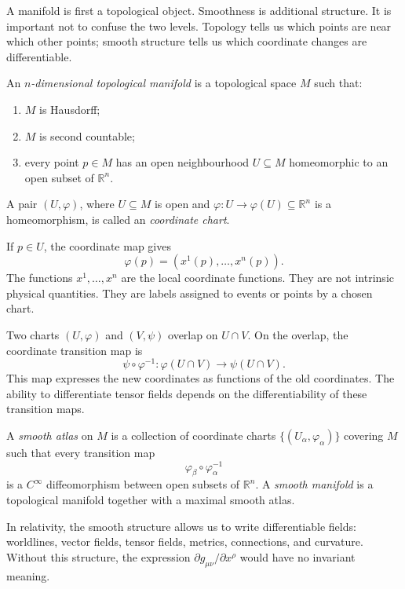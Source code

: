 A manifold is first a topological object. Smoothness is additional structure. It
is important not to confuse the two levels. Topology tells us which points are
near which other points; smooth structure tells us which coordinate changes are
differentiable.

\begin{definitionbox}
An \emph{\(n\)-dimensional topological manifold} is a topological space \(M\)
such that:
\begin{enumerate}
    \item \(M\) is Hausdorff;
    \item \(M\) is second countable;
    \item every point \(p\in M\) has an open neighbourhood \(U\subseteq M\)
    homeomorphic to an open subset of \(\mathbb{R}^n\).
\end{enumerate}
A pair \((U,\varphi)\), where \(U\subseteq M\) is open and
\(\varphi:U\to \varphi(U)\subseteq \mathbb{R}^n\) is a homeomorphism, is called
an \emph{coordinate chart}.
\end{definitionbox}

If \(p\in U\), the coordinate map gives
\[
\varphi(p)=(x^1(p),\ldots,x^n(p)).
\]
The functions \(x^1,\ldots,x^n\) are the local coordinate functions. They are not
intrinsic physical quantities. They are labels assigned to events or points by a
chosen chart.

Two charts \((U,\varphi)\) and \((V,\psi)\) overlap on \(U\cap V\). On the
overlap, the coordinate transition map is
\[
\psi\circ \varphi^{-1}:\varphi(U\cap V)\to \psi(U\cap V).
\]
This map expresses the new coordinates as functions of the old coordinates. The
ability to differentiate tensor fields depends on the differentiability of these
transition maps.

\begin{definitionbox}
A \emph{smooth atlas} on \(M\) is a collection of coordinate charts
\(\{(U_\alpha,\varphi_\alpha)\}\) covering \(M\) such that every transition map
\[
\varphi_\beta\circ \varphi_\alpha^{-1}
\]
is a \(C^\infty\) diffeomorphism between open subsets of \(\mathbb{R}^n\). A
\emph{smooth manifold} is a topological manifold together with a maximal smooth
atlas.
\end{definitionbox}

In relativity, the smooth structure allows us to write differentiable fields:
worldlines, vector fields, tensor fields, metrics, connections, and curvature.
Without this structure, the expression \(\partial g_{\mu\nu}/\partial x^\rho\)
would have no invariant meaning.

